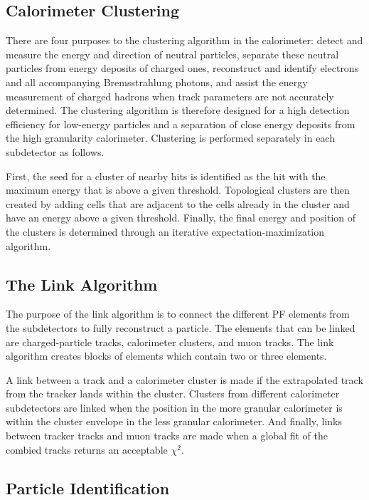 \subsection{Calorimeter Clustering}

There are four purposes to the clustering algorithm in the calorimeter: detect and measure the energy and direction of neutral particles, separate these neutral particles from energy deposits of charged ones, reconstruct and identify electrons and all accompanying Bremsstrahlung photons, and assist the energy measurement of charged hadrons when track parameters are not accurately determined. The clustering algorithm is therefore designed for a high detection efficiency for low-energy particles and a separation of close energy deposits from the high granularity calorimeter. Clustering is performed separately in each subdetector as follows.

First, the seed for a cluster of nearby hits is identified as the hit with the maximum energy that is above a given threshold. Topological clusters are then created by adding cells that are adjacent to the cells already in the cluster and have an energy above a given threshold. Finally, the final energy and position of the clusters is determined through an iterative expectation-maximization algorithm. 

\subsection{The Link Algorithm}

The purpose of the link algorithm is to connect the different PF elements from the subdetectors to fully reconstruct a particle. The elements that can be linked are charged-particle tracks, calorimeter clusters, and muon tracks. The link algorithm creates blocks of elements which contain two or three elements. 

A link between a track and a calorimeter cluster is made if the extrapolated track from the tracker lands within the cluster. Clusters from different calorimeter subdetectors are linked when the position in the more granular calorimeter is within the cluster envelope in the less granular calorimeter. And finally, links between tracker tracks and muon tracks are made when a global fit of the combied tracks returns an acceptable $\chi^{2}$. 

\subsection{Particle Identification}


